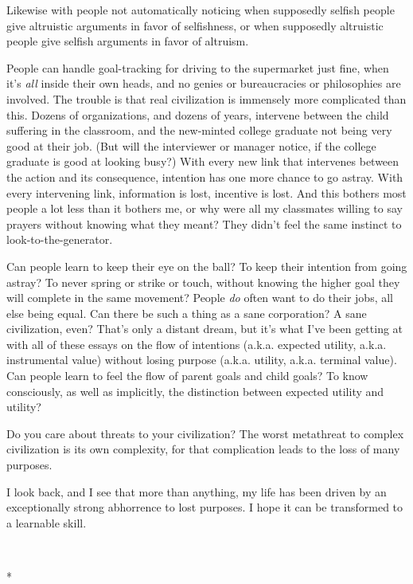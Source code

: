 {
 Likewise with people not automatically noticing when supposedly
selfish people give altruistic arguments in favor of selfishness, or
when supposedly altruistic people give selfish arguments in favor of
altruism.}

{
 People can handle goal-tracking for driving to the supermarket
just fine, when it's \textit{all} inside their own
heads, and no genies or bureaucracies or philosophies are involved. The
trouble is that real civilization is immensely more complicated than
this. Dozens of organizations, and dozens of years, intervene between
the child suffering in the classroom, and the new-minted college
graduate not being very good at their job. (But will the interviewer or
manager notice, if the college graduate is good at looking busy?) With
every new link that intervenes between the action and its consequence,
intention has one more chance to go astray. With every intervening
link, information is lost, incentive is lost. And this bothers most
people a lot less than it bothers me, or why were all my classmates
willing to say prayers without knowing what they meant? They
didn't feel the same instinct to
look-to-the-generator.}

{
 Can people learn to keep their eye on the ball? To keep their
intention from going astray? To never spring or strike or touch,
without knowing the higher goal they will complete in the same
movement? People \textit{do} often want to do their jobs, all else
being equal. Can there be such a thing as a sane corporation? A sane
civilization, even? That's only a distant dream, but
it's what I've been getting at with all
of these essays on the flow of intentions (a.k.a. expected utility,
a.k.a. instrumental value) without losing purpose (a.k.a. utility,
a.k.a. terminal value). Can people learn to feel the flow of parent
goals and child goals? To know consciously, as well as implicitly, the
distinction between expected utility and utility?}

{
 Do you care about threats to your civilization? The worst
metathreat to complex civilization is its own complexity, for that
complication leads to the loss of many purposes.}

{
 I look back, and I see that more than anything, my life has been
driven by an exceptionally strong abhorrence to lost purposes. I hope
it can be transformed to a learnable skill.}

{\centering
 \ ~
\par}

{\centering
 *
\par}


